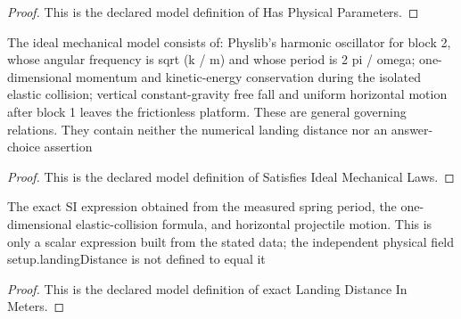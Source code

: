 \begin{proof}
  This is the declared model definition of Has Physical Parameters.
\end{proof}
\begin{definition}
  \label{def:physics:phyx-mini-0255:phyxminiproblems-problemphyxmini0255-satisfiesidealmechanicallaws}
  The ideal mechanical model consists of: Physlib's harmonic oscillator for block 2, whose angular frequency is sqrt (k / m) and whose period is 2 pi / omega; one-dimensional momentum and kinetic-energy conservation during the isolated elastic collision; vertical constant-gravity free fall and uniform horizontal motion after block 1 leaves the frictionless platform. These are general governing relations. They contain neither the numerical landing distance nor an answer-choice assertion
\end{definition}
\begin{proof}
  This is the declared model definition of Satisfies Ideal Mechanical Laws.
\end{proof}
\begin{definition}
  \label{def:physics:phyx-mini-0255:phyxminiproblems-problemphyxmini0255-exactlandingdistanceinmeters}
  The exact SI expression obtained from the measured spring period, the one-dimensional elastic-collision formula, and horizontal projectile motion. This is only a scalar expression built from the stated data; the independent physical field setup.landingDistance is not defined to equal it
\end{definition}
\begin{proof}
  This is the declared model definition of exact Landing Distance In Meters.
\end{proof}

